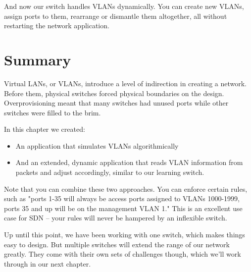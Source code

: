 And now our switch handles VLANs dynamically.  You can create new VLANs, assign ports to them, rearrange or
dismantle them altogether, all without restarting the network application.  

\section{Summary}

Virtual LANs, or VLANs, introduce a level of indirection in creating a network.  Before them, physical
switches forced physical boundaries on the design.  Overprovisioning meant that many switches had
unused ports while other switches were filled to the brim.  

In this chapter we created:

\begin{itemize}
\item An application that simulates VLANs algorithmically
\item And an extended, dynamic application that reads VLAN information from packets and adjust accordingly, 
similar to our learning switch.
\end{itemize}

Note that you can combine these two approaches.  You can enforce certain rules, such as "ports 1-35 will always
be access ports assigned to VLANs 1000-1999, ports 35 and up will be on the management VLAN 1."  This is an
excellent use case for SDN -- your rules will never be hampered by an inflexible switch.

Up until this point, we have been working with one switch, which makes things easy to design.  But multiple
switches will extend the range of our network greatly.  They come with their own sets of challenges though,
which we'll work through in our next chapter.  